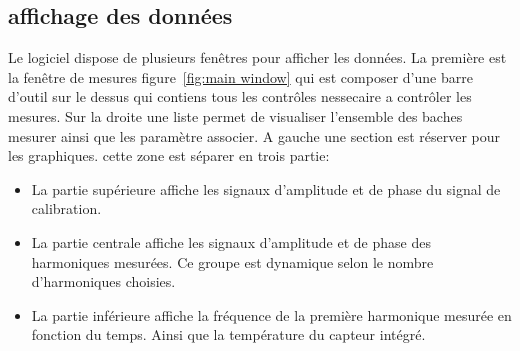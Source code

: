 \subsection{affichage des données}
Le logiciel dispose de plusieurs fenêtres pour afficher les données.
La première est la fenêtre de mesures figure~\ref{fig:main window} qui est composer d'une barre d'outil sur le dessus qui contiens tous les contrôles nessecaire a contrôler les mesures.
Sur la droite une liste permet de visualiser l'ensemble des baches mesurer ainsi que les paramètre associer.
A gauche une section est réserver pour les graphiques. cette zone est séparer en trois partie:
\begin{itemize}
    \item La partie supérieure affiche les signaux d'amplitude et de phase du signal de calibration.
    \item La partie centrale affiche les signaux d'amplitude et de phase des harmoniques mesurées. Ce groupe est dynamique selon le nombre d'harmoniques choisies.
    \item La partie inférieure affiche la fréquence de la première harmonique mesurée en fonction du temps. Ainsi que la température du capteur intégré.
\end{itemize}

